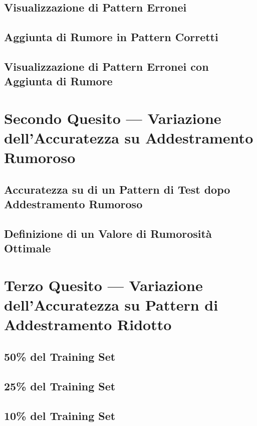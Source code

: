 \documentclass[12pt, a4paper]{article}
\begin{document}
\subsection{Visualizzazione di Pattern Erronei}
\subsection{Aggiunta di Rumore in Pattern Corretti}
\subsection{Visualizzazione di Pattern Erronei con Aggiunta di Rumore}

\newpage
\section{Secondo Quesito --- Variazione dell'Accuratezza su Addestramento Rumoroso}
\subsection{Accuratezza su di un Pattern di Test dopo Addestramento Rumoroso}
\subsection{Definizione di un Valore di Rumorosità Ottimale}

\newpage
\section{Terzo Quesito --- Variazione dell'Accuratezza su Pattern di Addestramento Ridotto}
\subsection{50\% del Training Set}
\subsection{25\% del Training Set}
\subsection{10\% del Training Set}
\end{document}
